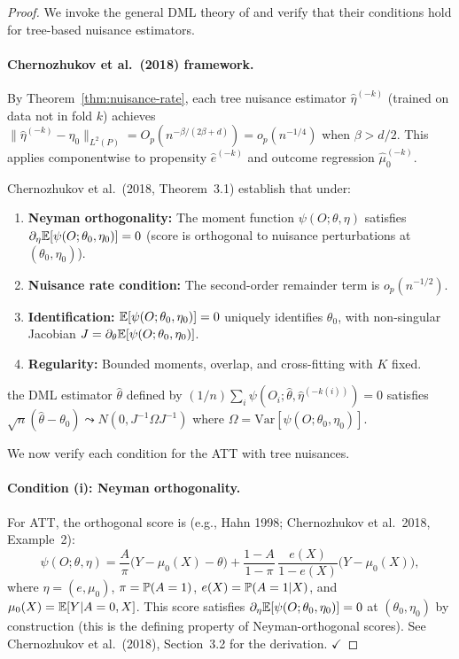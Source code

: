 \documentclass[12pt]{article}
\begin{document}
\begin{proof}
We invoke the general DML theory of \citet{chernozhukov2018} and verify that their conditions hold for tree-based nuisance estimators.

\paragraph{Chernozhukov et al.\ (2018) framework.}
By Theorem~\ref{thm:nuisance-rate}, each tree nuisance estimator $\hat\eta^{(-k)}$ (trained on data not in fold $k$) achieves $\|\hat\eta^{(-k)} - \eta_0\|_{L^2(P)} = O_p(n^{-\beta/(2\beta+d)}) = o_p(n^{-1/4})$ when $\beta > d/2$. This applies componentwise to propensity $\hat{e}^{(-k)}$ and outcome regression $\hat{\mu}_0^{(-k)}$.

Chernozhukov et al.\ (2018, Theorem~3.1) establish that under:
\begin{enumerate}[label=(\roman*)]
\item \textbf{Neyman orthogonality:} The moment function $\psi(O; \theta, \eta)$ satisfies $\partial_\eta \mathbb{E}[\psi(O; \theta_0, \eta_0)] = 0$ (score is orthogonal to nuisance perturbations at $(\theta_0, \eta_0)$).
\item \textbf{Nuisance rate condition:} The second-order remainder term is $o_p(n^{-1/2})$.
\item \textbf{Identification:} $\mathbb{E}[\psi(O; \theta_0, \eta_0)] = 0$ uniquely identifies $\theta_0$, with non-singular Jacobian $J = \partial_\theta \mathbb{E}[\psi(O; \theta_0, \eta_0)]$.
\item \textbf{Regularity:} Bounded moments, overlap, and cross-fitting with $K$ fixed.
\end{enumerate}
the DML estimator $\hat\theta$ defined by $(1/n)\sum_i \psi(O_i; \hat\theta, \hat\eta^{(-k(i))}) = 0$ satisfies $\sqrt{n}(\hat\theta - \theta_0) \leadsto N(0, J^{-1} \Omega J^{-1})$ where $\Omega = \text{Var}[\psi(O; \theta_0, \eta_0)]$.

We now verify each condition for the ATT with tree nuisances.

\paragraph{Condition (i): Neyman orthogonality.}
For ATT, the orthogonal score is (e.g., Hahn 1998; Chernozhukov et al.\ 2018, Example~2):
\[
\psi(O; \theta, \eta) = \frac{A}{\pi}\bigl( Y - \mu_0(X) - \theta \bigr) + \frac{1-A}{1-\pi} \, \frac{e(X)}{1 - e(X)} \bigl( Y - \mu_0(X) \bigr),
\]
where $\eta = (e, \mu_0)$, $\pi = \mathbb{P}(A=1)$, $e(X) = \mathbb{P}(A=1|X)$, and $\mu_0(X) = \mathbb{E}[Y|A=0,X]$. This score satisfies $\partial_\eta \mathbb{E}[\psi(O; \theta_0, \eta_0)] = 0$ at $(\theta_0, \eta_0)$ by construction (this is the defining property of Neyman-orthogonal scores). See Chernozhukov et al.\ (2018), Section~3.2 for the derivation. $\checkmark$


\end{proof}
\end{document}
